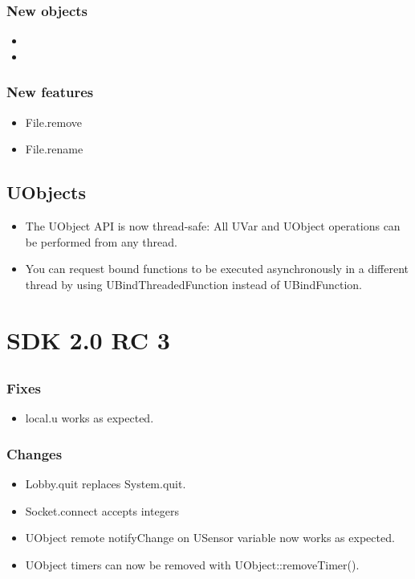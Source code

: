 \subsubsection{New objects}
\begin{itemize}
\item {}
\item {}
\end{itemize}

\subsubsection{New features}
\begin{itemize}
\item File.remove
\item File.rename
\end{itemize}

\subsection{UObjects}

\begin{itemize}
\item The UObject API is now thread-safe: All UVar and UObject
  operations can be performed from any thread.
\item You can request bound functions to be executed asynchronously in
  a different thread by using UBindThreadedFunction instead of
  UBindFunction.
\end{itemize}


\section{\urbi SDK 2.0 RC 3}

\subsection{\us}

\subsubsection{Fixes}
\begin{itemize}
\item local.u works as expected.
\end{itemize}

\subsubsection{Changes}
\begin{itemize}
\item Lobby.quit replaces System.quit.
\item Socket.connect accepts integers
\item UObject remote notifyChange on USensor variable now works as expected.
\item UObject timers can now be removed with UObject::removeTimer().
\end{itemize}


